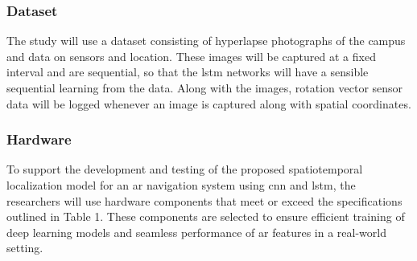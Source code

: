 \begin{refsection}
\subsubsection{Dataset}

The study will use a dataset consisting of hyperlapse photographs of the campus and data on sensors and location. These images will be captured at a fixed interval and are sequential, so that the \gls{lstm} networks will have a sensible sequential learning from the data. Along with the images, rotation vector sensor data will be logged whenever an image is captured along with spatial coordinates.

\subsubsection{Hardware}

To support the development and testing of the proposed spatiotemporal localization model for an \gls{ar} navigation system using \gls{cnn} and \gls{lstm}, the researchers will use hardware components that meet or exceed the specifications outlined in Table 1. These components are selected to ensure efficient training of deep learning models and seamless performance of \gls{ar} features in a real-world setting.


\end{refsection}
